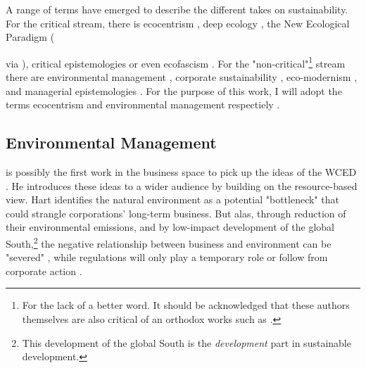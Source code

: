 \documentclass{article}
\begin{document}
	A range of terms have emerged to describe the different takes on sustainability. For the critical stream, there is ecocentrism \citep{Purser1995}, deep ecology \citep{Newton2002}, the New Ecological Paradigm ({\citealp{Catton1980} via \citealp{Hoffman2015}), critical epistemologies \citep{Ergene2020} or even ecofascism \citep{Newton2002}. For the "non-critical"\footnote{For the lack of a better word. It should be acknowledged that these authors themselves are also critical of an orthodox works such as \citet{Friedman1962}.} stream there are environmental management \citep{Purser1995}, corporate sustainability \citep{Hahn2014}, eco-modernism \citep{Springett2003}, and managerial epistemologies \citep{Ergene2020}. For the purpose of this work, I will adopt the terms ecocentrism and environmental management respectiely \citep{Purser1995}.


	\subsection*{Environmental Management}

	\citet{Hart1995b} is possibly the first work in the business space to pick up the ideas of the WCED \citep{Montiel2014}. He introduces these ideas to a wider audience by building on the resource-based view. Hart identifies the natural environment as a potential "bottleneck" that could strangle corporations' long-term business. But alas, through reduction of their environmental emissions, and by low-impact development of the global South,\footnote{This development of the global South is the \textit{development} part in sustainable development.} the negative relationship between business and environment can be "severed" \citep[p. 996]{Hart1995b}, while regulations will only play a temporary role or follow from corporate action \citep[footnote p. 991, p. 995]{Hart1995b}.

}
\end{document}
